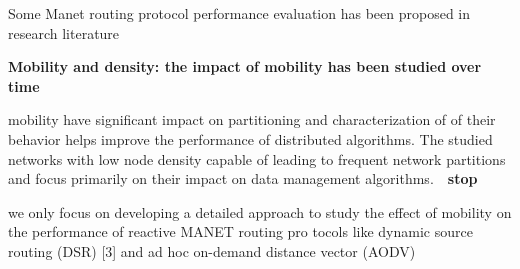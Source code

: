 \documentclass[letterpaper, 10 pt, conference]{ieeeconf}  %
\begin{document}
 





 



Some Manet routing protocol performance evaluation has been proposed in research literature

\textbf{Mobility and density: the impact of mobility has been studied over time} 

mobility have significant impact on partitioning and characterization of of their behavior helps improve the performance of distributed algorithms. The studied networks with low node density capable of leading to frequent network partitions and focus primarily on their impact on data management algorithms. \cite{Hahner2007QuantifyingNetworks}
 
\textbf{stop}

we only focus on developing a detailed approach to study the effect of mobility on the performance of reactive MANET routing pro tocols like dynamic source routing (DSR) [3] and ad hoc on-demand distance vector (AODV) \cite{Bai2004ModelingProtocolsb}





\end{document}
